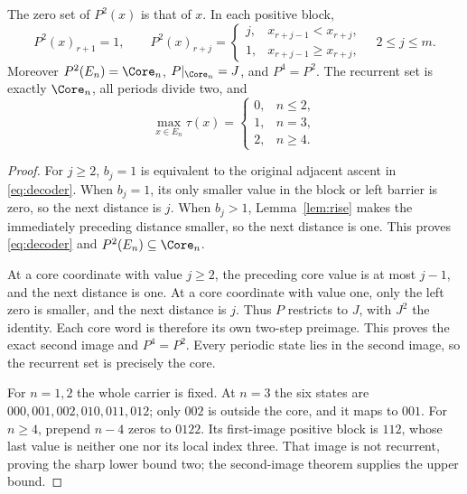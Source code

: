 \begin{theorem}\label{thm:temporal}
The zero set of $P^2(x)$ is that of $x$. In each positive block,
\begin{equation}\label{eq:decoder}
 P^2(x)_{r+1}=1,\qquad
 P^2(x)_{r+j}=
 \begin{cases}
 j,&x_{r+j-1}<x_{r+j},\\
 1,&x_{r+j-1}\ge x_{r+j},
 \end{cases}\quad 2\le j\le m.
\end{equation}
Moreover $P^2(E_n)=\Core_n$, $P|_{\Core_n}=J$, and $P^4=P^2$.
The recurrent set is exactly $\Core_n$, all periods divide two, and
\begin{equation}\label{eq:height}
 \max_{x\in E_n}\tau(x)=
 \begin{cases}0,&n\le2,\\1,&n=3,\\2,&n\ge4.\end{cases}
\end{equation}
\end{theorem}
\begin{proof}
For $j\ge2$, $b_j=1$ is equivalent to the original adjacent ascent in
\eqref{eq:decoder}. When $b_j=1$, its only smaller value in the block
or left barrier is zero, so the next distance is $j$. When $b_j>1$,
Lemma~\ref{lem:rise} makes the immediately preceding distance smaller,
so the next distance is one. This proves \eqref{eq:decoder} and
$P^2(E_n)\subseteq\Core_n$.

At a core coordinate with value $j\ge2$, the preceding core value is
at most $j-1$, and the next distance is one. At a core coordinate with
value one, only the left zero is smaller, and the next distance is $j$.
Thus $P$ restricts to $J$, with $J^2$ the identity. Each core word is
therefore its own two-step preimage. This proves the exact second image
and $P^4=P^2$. Every periodic state lies in the second image, so the
recurrent set is precisely the core.

For $n=1,2$ the whole carrier is fixed. At $n=3$ the six states are
$000,001,002,010,011,012$; only $002$ is outside the core, and it maps
to $001$. For $n\ge4$, prepend $n-4$ zeros to $0122$. Its first-image
positive block is $112$, whose last value is neither one nor its local
index three. That image is not recurrent, proving the sharp lower bound
two; the second-image theorem supplies the upper bound.
\end{proof}

